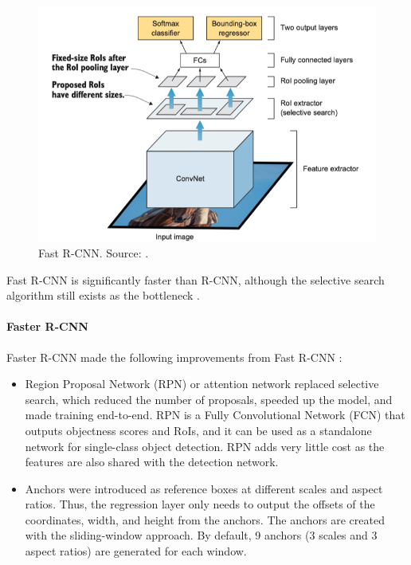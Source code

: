 \documentclass[a4paper, 11pt, oneside]{article}
\begin{document}
\begin{figure}[ht]
  \begin{center}
    \includegraphics[width=.8\textwidth]{fast_r_cnn.png}
  \end{center}
  \caption{Fast R-CNN. Source: \cite{elgendy2020deep}.}
\end{figure}

Fast R-CNN is significantly faster than R-CNN, although the selective search algorithm still exists as the bottleneck
\cite{elgendy2020deep, girshick2015fast, ren2015faster}.

\paragraph{Faster R-CNN}

Faster R-CNN made the following improvements from Fast R-CNN \cite{elgendy2020deep, ren2015faster}:

\begin{itemize}
  \item Region Proposal Network (RPN) or attention network replaced selective search, which reduced the number of
  proposals, speeded up the model, and made training end-to-end. RPN is a Fully Convolutional Network (FCN)
  \cite{long2015fully} that outputs objectness scores and RoIs, and it can be used as a standalone network for
  single-class object detection. RPN adds very little cost as the features are also shared with the detection network.
  \item Anchors were introduced as reference boxes at different scales and aspect ratios. Thus, the regression layer
  only needs to output the offsets of the coordinates, width, and height from the anchors. The anchors are created with
  the sliding-window approach. By default, 9 anchors (3 scales and 3 aspect ratios) are generated for each window.
\end{itemize}
\end{document}
